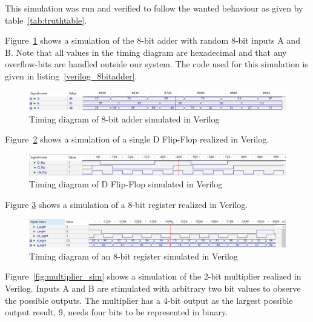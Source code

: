 This simulation was run and verified to follow the wanted behaviour as given by table~\ref{tab:truthtable}.

Figure~\ref{fig:eightbitadder_sim} shows a simulation of the 8-bit adder with random 8-bit inputs A and B. Note that all values in the timing diagram are hexadecimal and that any overflow-bits are handled outside our system. The code used for this simulation is given in listing~\ref{verilog_8bitadder}.

\begin{figure}[H]
    \centering
    \includegraphics[width=\textwidth]{Figures/Test of eightbitadder.png}
    \caption{Timing diagram of 8-bit adder simulated in Verilog}
    \label{fig:eightbitadder_sim}
\end{figure}

Figure~\ref{fig:dflipflop_sim} shows a simulation of a single D Flip-Flop realized in Verilog.

\begin{figure}[H]
    \centering
    \includegraphics[width=\textwidth]{Figures/Test of Dflipflop.png}
    \caption{Timing diagram of D Flip-Flop simulated in Verilog}
    \label{fig:dflipflop_sim}
\end{figure}

Figure \ref{fig:8bitregister_sim} shows a simulation of a 8-bit register realized in Verilog.

\begin{figure}[H]
    \centering
    \includegraphics[width=\textwidth]{Figures/VerilogPlot_8bitreg.png}
    \caption{Timing diagram of an 8-bit register simulated in Verilog}
    \label{fig:8bitregister_sim}
\end{figure}

Figure~\ref{fig:multiplier_sim} shows a simulation of the 2-bit multiplier realized in Verilog. Inputs A and B are stimulated with arbitrary two bit values to observe the possible outputs. The multiplier has a 4-bit output as the largest possible output result, 9, needs four bits to be represented in binary.

